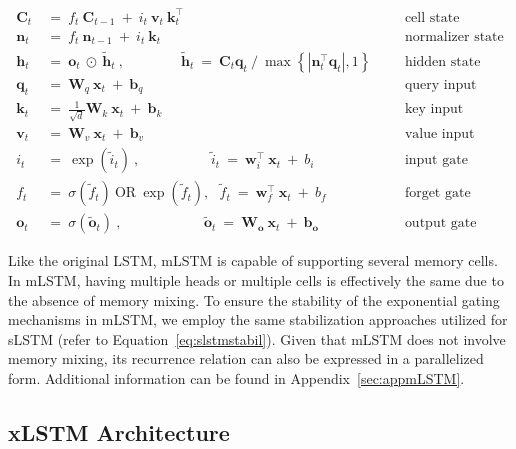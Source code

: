 \begin{align}
\label{eq:mlstm_recurrent_begin}
\mathbf{C}_t \ &= \  f_t \ \mathbf{C}_{t-1} \ + \ 
  i_t \ \mathbf{v}_t \ \mathbf{k}_t^\top & &  &\text{cell state} \\
\mathbf{n}_t \ &= \  f_t \ \mathbf{n}_{t-1} \ + \ 
  i_t \ \mathbf{k}_t & &  &\text{normalizer state} \\
\mathbf{h}_t  \ &= \ \mathbf{o}_t \ \odot \ \tilde{\mathbf{h}}_t
\ , \qquad \qquad 
\tilde{\mathbf{h}}_t \ = \   \mathbf{C}_t \mathbf{q}_t \ / \ 
  \max \left\{ |\mathbf{n}_t^\top \mathbf{q}_t|, 1 \right\} 
   &&&\text{hidden state} \\
\mathbf{q}_t \ &= \ \mathbf{W}_q \ \mathbf{x}_t \ + \ \mathbf{b}_q  & &  &\text{query input} \\
\mathbf{k}_t \ &= \ \frac{1}{\sqrt{d}} \mathbf{W}_k \ \mathbf{x}_t \ + \ \mathbf{b}_k  & &  &\text{key input} \\
\mathbf{v}_t \ &= \ \mathbf{W}_v \ \mathbf{x}_t \ + \ \mathbf{b}_v  & &  &\text{value input} \\
i_t \ &= \ \!\exp \!  \! \left( \tilde{i}_t  \right) \ , 
 \qquad \qquad \ \ \ \ \,
  \tilde{i}_t \ = \ \mathbf{w}^\top_{i} \ \mathbf{x}_t \ + \  b_{i} \ \ \ 
  &&&\text{input gate} \\
f_t \ &= \ \sigma \!  \left(  \tilde{f}_t \right) \ \text{OR} \ \!\exp \!  \! \left(  \tilde{f}_t \right) , \ \ \: \!
\tilde{f}_t \ = \ \mathbf{w}^\top_{f} \ \mathbf{x}_t  \ + \
  b_{f}
  &&& \text{forget gate} \\
\label{eq:mlstm_recurrent_end}
\mathbf{o}_t \ &= \ \sigma \left( \tilde{\mathbf{o}}_t \right) \ , \qquad \qquad \quad \ \ \ \,
  \tilde{\mathbf{o}}_t  \ = \ \mathbf{W}_{\mathbf{o}} \ \mathbf{x}_t \ + \
  \mathbf{b}_{\mathbf{o}}
  &&&\text{output gate} 
\end{align}

Like the original LSTM, mLSTM is capable of supporting several memory cells. In mLSTM, having multiple heads or multiple cells is effectively the same due to the absence of memory mixing. To ensure the stability of the exponential gating mechanisms in mLSTM, we employ the same stabilization approaches utilized for sLSTM (refer to Equation~\ref{eq:slstmstabil}). Given that mLSTM does not involve memory mixing, its recurrence relation can also be expressed in a parallelized form. Additional information can be found in Appendix~\ref{sec:appmLSTM}.

\subsection{xLSTM Architecture}
\label{sec:xLSTMarch}

